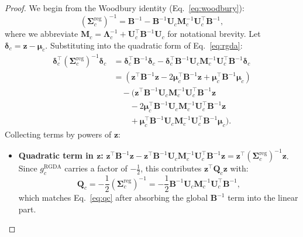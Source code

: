 \documentclass{article}
\begin{document}
\begin{proof}
We begin from the Woodbury identity (Eq.~\eqref{eq:woodbury}):
\begin{equation}
    (\mathbf{\Sigma}_c^{\text{reg}})^{-1} = \mathbf{B}^{-1} - \mathbf{B}^{-1} \mathbf{U}_c \mathbf{M}_c^{-1} \mathbf{U}_c^\top \mathbf{B}^{-1},
\end{equation}
where we abbreviate $\mathbf{M}_c = \boldsymbol{\Lambda}_c^{-1} + \mathbf{U}_c^\top \mathbf{B}^{-1} \mathbf{U}_c$ for notational brevity. Let $\boldsymbol{\delta}_c = \mathbf{z} - \boldsymbol{\mu}_c$. Substituting into the quadratic form of Eq.~\eqref{eq:rgda}:
\begin{align}
    \boldsymbol{\delta}_c^\top (\mathbf{\Sigma}_c^{\text{reg}})^{-1} \boldsymbol{\delta}_c
    &= \boldsymbol{\delta}_c^\top \mathbf{B}^{-1} \boldsymbol{\delta}_c - \boldsymbol{\delta}_c^\top \mathbf{B}^{-1} \mathbf{U}_c \mathbf{M}_c^{-1} \mathbf{U}_c^\top \mathbf{B}^{-1} \boldsymbol{\delta}_c \nonumber\\
    &= (\mathbf{z}^\top \mathbf{B}^{-1} \mathbf{z} - 2\boldsymbol{\mu}_c^\top \mathbf{B}^{-1} \mathbf{z} + \boldsymbol{\mu}_c^\top \mathbf{B}^{-1} \boldsymbol{\mu}_c) \nonumber\\
    &\quad - \bigl(
    \mathbf{z}^\top \mathbf{B}^{-1} \mathbf{U}_c \mathbf{M}_c^{-1}
    \mathbf{U}_c^\top \mathbf{B}^{-1} \mathbf{z} \nonumber\\
    &\qquad
    - 2\boldsymbol{\mu}_c^\top \mathbf{B}^{-1} \mathbf{U}_c \mathbf{M}_c^{-1}
    \mathbf{U}_c^\top \mathbf{B}^{-1} \mathbf{z} \nonumber\\
    &\qquad
    + \boldsymbol{\mu}_c^\top \mathbf{B}^{-1} \mathbf{U}_c \mathbf{M}_c^{-1}
    \mathbf{U}_c^\top \mathbf{B}^{-1} \boldsymbol{\mu}_c
    \bigr). \label{eq:quad_expand}
\end{align}
Collecting terms by powers of $\mathbf{z}$:
\begin{itemize}
    \item \textbf{Quadratic term in $\mathbf{z}$:} $\mathbf{z}^\top \mathbf{B}^{-1} \mathbf{z} - \mathbf{z}^\top \mathbf{B}^{-1} \mathbf{U}_c \mathbf{M}_c^{-1} \mathbf{U}_c^\top \mathbf{B}^{-1} \mathbf{z} = \mathbf{z}^\top (\mathbf{\Sigma}_c^{\text{reg}})^{-1} \mathbf{z}$.
    Since $g_c^{\text{RGDA}}$ carries a factor of $-\frac{1}{2}$, this contributes $\mathbf{z}^\top \mathbf{Q}_c \mathbf{z}$ with:
    \begin{equation}
        \mathbf{Q}_c = -\frac{1}{2}(\mathbf{\Sigma}_c^{\text{reg}})^{-1} = -\frac{1}{2}\mathbf{B}^{-1} \mathbf{U}_c \mathbf{M}_c^{-1} \mathbf{U}_c^\top \mathbf{B}^{-1},
    \end{equation}
    which matches Eq.~\eqref{eq:qc} after absorbing the global $\mathbf{B}^{-1}$ term into the linear part.


\end{itemize}
\end{proof}
\end{document}
